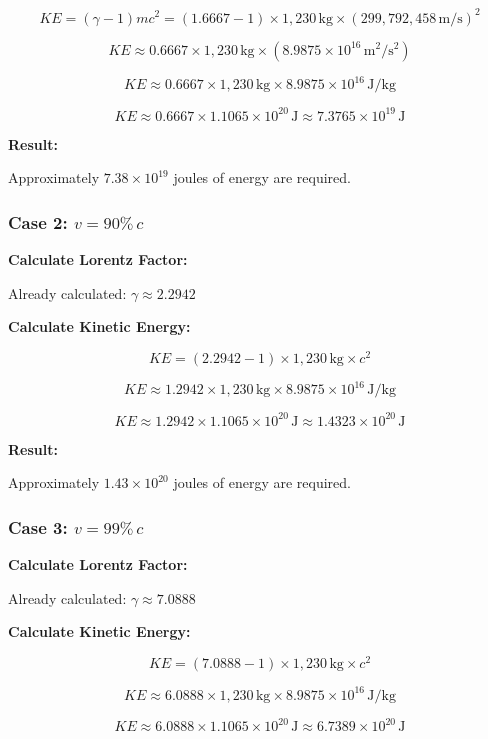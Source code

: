 \documentclass{article}
\begin{document}
\begin{multicols}{2}
\[
KE = (\gamma - 1) m c^2 = (1.6667 - 1) \times 1{,}230\, \text{kg} \times (299{,}792{,}458\, \text{m/s})^2
\]

\[
KE \approx 0.6667 \times 1{,}230\, \text{kg} \times (8.9875 \times 10^{16}\, \text{m}^2/\text{s}^2)
\]

\[
KE \approx 0.6667 \times 1{,}230\, \text{kg} \times 8.9875 \times 10^{16}\, \text{J/kg}
\]

\[
KE \approx 0.6667 \times 1.1065 \times 10^{20}\, \text{J} \approx 7.3765 \times 10^{19}\, \text{J}
\]

\textbf{Result:}

Approximately \( 7.38 \times 10^{19} \) joules of energy are required.

\subsubsection*{Case 2: \( v = 90\% \, c \)}

\textbf{Calculate Lorentz Factor:}

Already calculated: \( \gamma \approx 2.2942 \)

\textbf{Calculate Kinetic Energy:}

\[
KE = (2.2942 - 1) \times 1{,}230\, \text{kg} \times c^2
\]

\[
KE \approx 1.2942 \times 1{,}230\, \text{kg} \times 8.9875 \times 10^{16}\, \text{J/kg}
\]

\[
KE \approx 1.2942 \times 1.1065 \times 10^{20}\, \text{J} \approx 1.4323 \times 10^{20}\, \text{J}
\]

\textbf{Result:}

Approximately \( 1.43 \times 10^{20} \) joules of energy are required.

\subsubsection*{Case 3: \( v = 99\% \, c \)}

\textbf{Calculate Lorentz Factor:}

Already calculated: \( \gamma \approx 7.0888 \)

\textbf{Calculate Kinetic Energy:}

\[
KE = (7.0888 - 1) \times 1{,}230\, \text{kg} \times c^2
\]

\[
KE \approx 6.0888 \times 1{,}230\, \text{kg} \times 8.9875 \times 10^{16}\, \text{J/kg}
\]

\[
KE \approx 6.0888 \times 1.1065 \times 10^{20}\, \text{J} \approx 6.7389 \times 10^{20}\, \text{J}
\]


\end{multicols}
\end{document}
